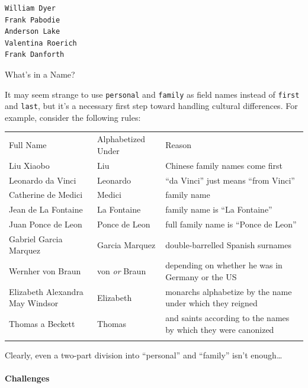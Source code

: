 \documentclass{book}
\begin{document}
\begin{verbatim}
William Dyer
Frank Pabodie
Anderson Lake
Valentina Roerich
Frank Danforth
\end{verbatim}

\begin{swcbox}{What's in a Name?}

It may seem strange to use \texttt{personal} and \texttt{family} as
field names instead of \texttt{first} and \texttt{last}, but it's a
necessary first step toward handling cultural differences. For example,
consider the following rules:

\begin{tabular}{@{}lll@{}}
\hline\noalign{\medskip}
Full Name & Alphabetized Under & Reason
\\\noalign{\medskip}
\hline\noalign{\medskip}
Liu Xiaobo & Liu & Chinese family names come first
\\\noalign{\medskip}
Leonardo da Vinci & Leonardo & ``da Vinci'' just means ``from Vinci''
\\\noalign{\medskip}
Catherine de Medici & Medici & family name
\\\noalign{\medskip}
Jean de La Fontaine & La Fontaine & family name is ``La Fontaine''
\\\noalign{\medskip}
Juan Ponce de Leon & Ponce de Leon & full family name is ``Ponce de
Leon''
\\\noalign{\medskip}
Gabriel Garcia Marquez & Garcia Marquez & double-barrelled Spanish
surnames
\\\noalign{\medskip}
Wernher von Braun & von \emph{or} Braun & depending on whether he was in
Germany or the US
\\\noalign{\medskip}
Elizabeth Alexandra May Windsor & Elizabeth & monarchs alphabetize by
the name under which they reigned
\\\noalign{\medskip}
Thomas a Beckett & Thomas & and saints according to the names by which
they were canonized
\\\noalign{\medskip}
\hline
\end{tabular}

Clearly, even a two-part division into ``personal'' and ``family'' isn't
enough\ldots{}

\end{swcbox}

\mbox{}\paragraph{Challenges}
\end{document}
